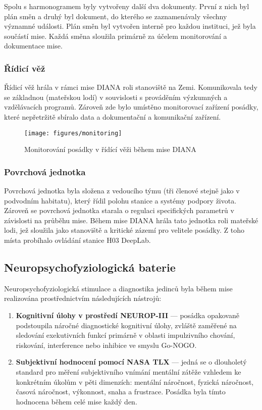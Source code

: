 Spolu s harmonogramem byly vytvořeny další dva dokumenty. První z nich byl plán
směn a druhý byl dokument, do kterého se zaznamenávaly všechny významné
události. Plán směn byl vytvořen interně pro každou instituci, jež byla součástí
mise. Každá směna sloužila primárně za účelem monitorování a dokumentace mise.

\subsubsection{Řídicí věž}
\label{subsubsec:ridici_vez}
Řídicí věž hrála v rámci mise DIANA roli stanoviště na Zemi. Komunikovala tedy
se základnou (mateřskou lodí) v souvislosti s prováděním výzkumných a
vzdělávacích programů. Zároveň zde bylo umístěno monitorovací zařízení posádky,
které nepřetržitě sbíralo data a dokumentační a komunikační zařízení.

\begin{figure}[h]
    \begin{center}
        \texttt{[image: figures/monitoring]}
        \caption{Monitorování posádky v řídící věži během mise DIANA}
        \label{fig:monitoring}
    \end{center}
\end{figure}

\subsubsection{Povrchová jednotka}
\label{subsubsec:povrchova_jednotka}
Povrchová jednotka byla složena z vedoucího týmu (tři členové stejně jako v
podvodním habitatu), který řídil polohu stanice a systémy podpory života.
Zároveň se povrchová jednotka starala o regulaci specifických parametrů v
závislosti na průběhu mise. Během mise DIANA hrála tato jednotka roli mateřské
lodi, jež sloužila jako stanoviště a kritické zázemí pro velitele posádky. Z
toho místa probíhalo ovládání stanice H03 DeepLab.

\subsection{Neuropsychofyziologická baterie}
\label{subsubsec:neuro_testy}
Neuropsychofyziologická stimulace a diagnostika jedinců byla během mise
realizována prostřednictvím následujících nástrojů:
\begin{enumerate}
    \item \textbf{Kognitivní úlohy v prostředí NEUROP-III} --- posádka opakovaně
          podstoupila náročné diagnostické kognitivní úlohy, zvláště zaměřené na
          sledování exekutivních funkcí primárně v oblasti impulzivního chování,
          riskování, interference nebo inhibice ve smyslu Go-NOGO.
    \item \textbf{Subjektivní hodnocení pomocí NASA TLX} --- jedná se o
          dlouholetý standard pro měření subjektivního vnímání mentální zátěže
          vzhledem ke konkrétním úkolům v pěti dimenzích: mentální náročnost, fyzická
          náročnost, časová náročnost, výkonnost, snaha a frustrace. Posádka byla
          tímto hodnocena během celé mise každý den.
\end{enumerate}


